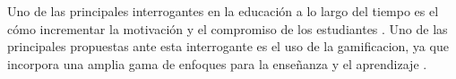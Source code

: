 





 Uno de las principales interrogantes en la educación a lo largo del tiempo es el 
 cómo incrementar la motivación y el compromiso de los estudiantes \cite{Lee}. Uno 
 de las principales propuestas ante esta interrogante es el uso de la 
 \gls{gamificacion}, ya que incorpora una amplia gama de enfoques para la enseñanza 
 y el aprendizaje \cite{Aldemir}.\\


